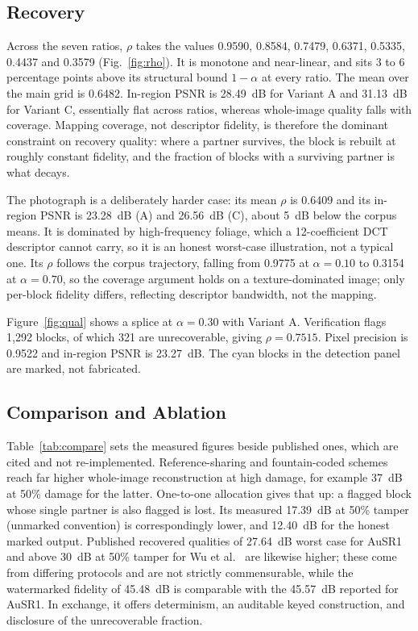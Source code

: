 \documentclass[conference]{IEEEtran}
\begin{document}
\subsection{Recovery}
Across the seven ratios, $\rho$ takes the values 0.9590, 0.8584, 0.7479, 0.6371, 0.5335, 0.4437 and 0.3579 (Fig.~\ref{fig:rho}). It is monotone and near-linear, and sits 3 to 6 percentage points above its structural bound $1-\alpha$ at every ratio. The mean over the main grid is 0.6482. In-region PSNR is 28.49~dB for Variant A and 31.13~dB for Variant C, essentially flat across ratios, whereas whole-image quality falls with coverage. Mapping coverage, not descriptor fidelity, is therefore the dominant constraint on recovery quality: where a partner survives, the block is rebuilt at roughly constant fidelity, and the fraction of blocks with a surviving partner is what decays.

The photograph is a deliberately harder case: its mean $\rho$ is 0.6409 and its in-region PSNR is 23.28~dB (A) and 26.56~dB (C), about 5~dB below the corpus means. It is dominated by high-frequency foliage, which a 12-coefficient DCT descriptor cannot carry, so it is an honest worst-case illustration, not a typical one. Its $\rho$ follows the corpus trajectory, falling from 0.9775 at $\alpha=0.10$ to 0.3154 at $\alpha=0.70$, so the coverage argument holds on a texture-dominated image; only per-block fidelity differs, reflecting descriptor bandwidth, not the mapping.

Figure~\ref{fig:qual} shows a splice at $\alpha=0.30$ with Variant A. Verification flags 1,292 blocks, of which 321 are unrecoverable, giving $\rho=0.7515$. Pixel precision is 0.9522 and in-region PSNR is 23.27~dB. The cyan blocks in the detection panel are marked, not fabricated.

\subsection{Comparison and Ablation}
Table~\ref{tab:compare} sets the measured figures beside published ones, which are cited and not re-implemented. Reference-sharing and fountain-coded schemes \cite{zhang2011reference,korus2013efficient} reach far higher whole-image reconstruction at high damage, for example 37~dB at 50\% damage for the latter. One-to-one allocation gives that up: a flagged block whose single partner is also flagged is lost. Its measured 17.39~dB at 50\% tamper (unmarked convention) is correspondingly lower, and 12.40~dB for the honest marked output. Published recovered qualities of 27.64~dB worst case for AuSR1 \cite{ausr1} and above 30~dB at 50\% tamper for Wu et al.\ \cite{wu2026multifeature} are likewise higher; these come from differing protocols and are not strictly commensurable, while the watermarked fidelity of 45.48~dB is comparable with the 45.57~dB reported for AuSR1. In exchange, it offers determinism, an auditable keyed construction, and disclosure of the unrecoverable fraction.
\end{document}
